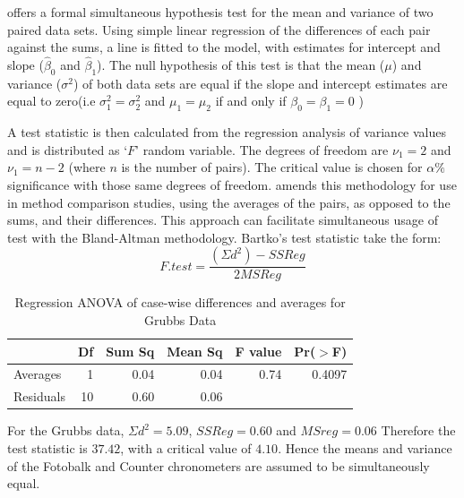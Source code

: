 \documentclass[12pt, a4paper]{report}
\theoremstyle{plain}
\theoremstyle{definition}
\theoremstyle{remark}
\begin{document}
	\citet{BB89} offers a formal simultaneous hypothesis test for the
	mean and variance of two paired data sets. Using simple linear
	regression of the differences of each pair against the sums, a
	line is fitted to the model, with estimates for intercept and
	slope ($\hat{\beta}_{0}$ and $\hat{\beta}_{1}$). The null
	hypothesis of this test is that the mean ($\mu$) and variance
	($\sigma^{2}$) of both data sets are equal if the slope and
	intercept estimates are equal to zero(i.e $\sigma^{2}_{1} =
	\sigma^{2}_{2}$ and $\mu_{1}=\mu_{2}$ if and only if $\beta_{0}=
	\beta_{1}=0$ )
	
	A test statistic is then calculated from the regression analysis
	of variance values \citep{BB89} and is distributed as `$F$' random
	variable. The degrees of freedom are $\nu_{1}=2$ and $\nu_{1}=n-2$
	(where $n$ is the number of pairs). The critical value is chosen
	for $\alpha\%$ significance with those same degrees of freedom.
	\citet{Bartko} amends this methodology for use in method
	comparison studies, using the averages of the pairs, as opposed to
	the sums, and their differences. This approach can facilitate
	simultaneous usage of test with the Bland-Altman methodology.
	Bartko's test statistic take the form:
	\[ F.test = \frac{(\Sigma d^{2})-SSReg}{2MSReg}
	\]
	\begin{table}[ht]
		\begin{center}
			\begin{tabular}{lrrrrr}
				\hline
				& Df & Sum Sq & Mean Sq & F value & Pr($>$F) \\
				\hline
				Averages & 1 & 0.04 & 0.04 & 0.74 & 0.4097 \\
				Residuals & 10 & 0.60 & 0.06 &  &  \\
				\hline
			\end{tabular}
			\caption{Regression ANOVA of case-wise differences and averages
				for Grubbs Data}
		\end{center}
	\end{table}
	
	For the Grubbs data, $\Sigma d^{2}=5.09 $, $SSReg = 0.60$ and
	$MSreg=0.06$ Therefore the test statistic is $37.42$, with a
	critical value of $4.10$. Hence the means and variance of the
	Fotobalk and Counter chronometers are assumed to be simultaneously
	equal.
	
\end{document}

